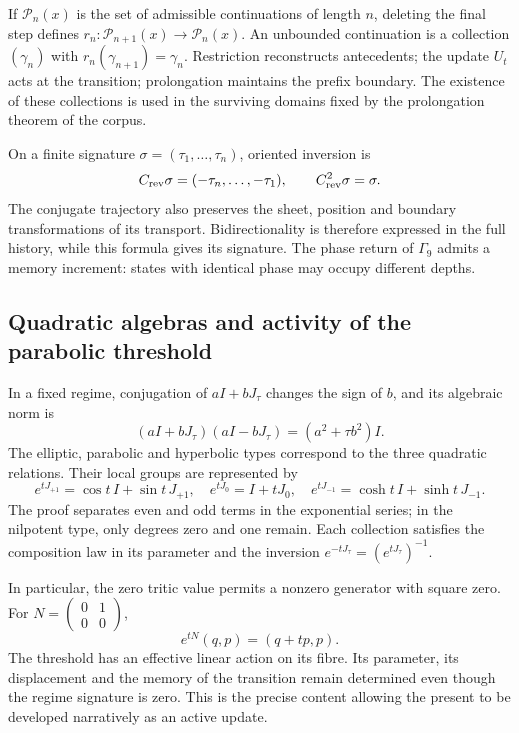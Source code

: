 If \(\mathcal P_n(x)\) is the set of admissible continuations of
length \(n\), deleting the final step defines
\(r_n:\mathcal P_{n+1}(x)\to\mathcal P_n(x)\). An unbounded continuation
is a collection \((\gamma_n)\) with
\(r_n(\gamma_{n+1})=\gamma_n\). Restriction reconstructs antecedents;
the update \(U_t\) acts at the transition; prolongation maintains
the prefix boundary. The existence of these collections is used in
the surviving domains fixed by the prolongation theorem of the
corpus.

On a finite signature \(\sigma=(\tau_1,\ldots,\tau_n)\), oriented
inversion is
\[
 C_{\rm rev}\sigma=(-\tau_n,\ldots,-\tau_1),
 \qquad C_{\rm rev}^2\sigma=\sigma.
\]
The conjugate trajectory also preserves the sheet,
position and boundary transformations of its transport. Bidirectionality is therefore
expressed in the full history, while this formula gives its signature.
The phase return of \(\Gamma_9\) admits a memory increment:
states with identical phase may occupy different depths.

\subsection{Quadratic algebras and activity of the parabolic threshold}

In a fixed regime, conjugation of \(aI+bJ_\tau\) changes the sign
of \(b\), and its algebraic norm is
\[
 (aI+bJ_\tau)(aI-bJ_\tau)=(a^2+\tau b^2)I.
\]
The elliptic, parabolic and hyperbolic types correspond to the three
quadratic relations. Their local groups are represented by
\[
 e^{tJ_{+1}}=\cos t\,I+\sin t\,J_{+1},\quad
 e^{tJ_0}=I+tJ_0,\quad
 e^{tJ_{-1}}=\cosh t\,I+\sinh t\,J_{-1}.
\]
The proof separates even and odd terms in the exponential series; in the
nilpotent type, only degrees zero and one remain. Each collection
satisfies the composition law in its parameter and the inversion
\(e^{-tJ_\tau}=(e^{tJ_\tau})^{-1}\).

In particular, the zero tritic value permits a nonzero generator
with square zero. For
\(N=\left(\begin{smallmatrix}0&1\\0&0\end{smallmatrix}\right)\),
\[
 e^{tN}(q,p)=(q+tp,p).
\]
The threshold has an effective linear action on its fibre. Its parameter,
its displacement and the memory of the transition remain determined
even though the regime signature is zero. This is the precise content
allowing the present to be developed narratively as an active update.

